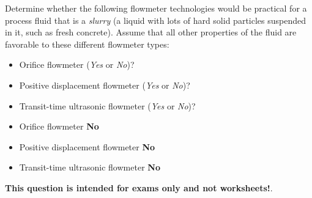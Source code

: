 

Determine whether the following flowmeter technologies would be practical for a process fluid that is a {\it slurry} (a liquid with lots of hard solid particles suspended in it, such as fresh concrete).  Assume that all other properties of the fluid are favorable to these different flowmeter types:

\begin{itemize}
\item{} Orifice flowmeter ({\it Yes} or {\it No})?
\vskip 10pt
\item{} Positive displacement flowmeter ({\it Yes} or {\it No})?
\vskip 10pt
\item{} Transit-time ultrasonic flowmeter ({\it Yes} or {\it No})?
\end{itemize}







\begin{itemize}
\item{} Orifice flowmeter {\bf No}
\item{} Positive displacement flowmeter {\bf No} 
\item{} Transit-time ultrasonic flowmeter {\bf No} 
\end{itemize}







{\bf This question is intended for exams only and not worksheets!}.



